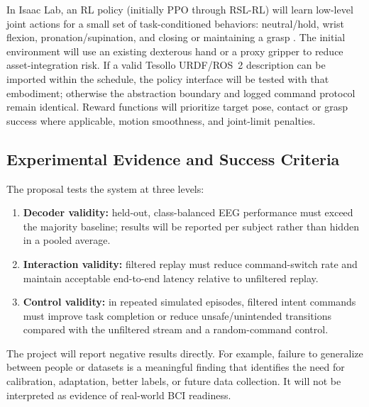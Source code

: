\documentclass[11pt]{article}
\begin{document}
In Isaac Lab, an RL policy (initially PPO through RSL-RL) will learn low-level joint actions for a small set of task-conditioned behaviors: neutral/hold, wrist flexion, pronation/supination, and closing or maintaining a grasp \citep{isaaclab,rslrl}. The initial environment will use an existing dexterous hand or a proxy gripper to reduce asset-integration risk. If a valid Tesollo URDF/ROS~2 description can be imported within the schedule, the policy interface will be tested with that embodiment; otherwise the abstraction boundary and logged command protocol remain identical. Reward functions will prioritize target pose, contact or grasp success where applicable, motion smoothness, and joint-limit penalties.

\subsection{Experimental Evidence and Success Criteria}
The proposal tests the system at three levels:

\begin{enumerate}
    \item \textbf{Decoder validity:} held-out, class-balanced EEG performance must exceed the majority baseline; results will be reported per subject rather than hidden in a pooled average.
    \item \textbf{Interaction validity:} filtered replay must reduce command-switch rate and maintain acceptable end-to-end latency relative to unfiltered replay.
    \item \textbf{Control validity:} in repeated simulated episodes, filtered intent commands must improve task completion or reduce unsafe/unintended transitions compared with the unfiltered stream and a random-command control.
\end{enumerate}

The project will report negative results directly. For example, failure to generalize between people or datasets is a meaningful finding that identifies the need for calibration, adaptation, better labels, or future data collection. It will not be interpreted as evidence of real-world BCI readiness.
\end{document}
